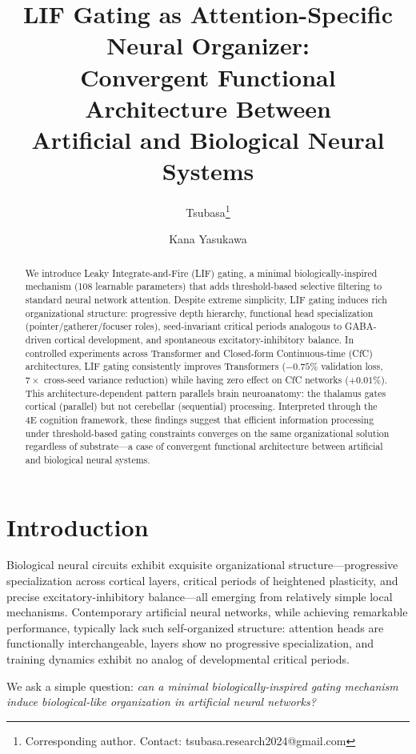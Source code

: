 \documentclass[11pt]{article}
\title{LIF Gating as Attention-Specific Neural Organizer: \\
Convergent Functional Architecture Between \\
Artificial and Biological Neural Systems}
\author[1]{Tsubasa\thanks{Corresponding author. Contact: tsubasa.research2024@gmail.com}}
\author[2]{Kana Yasukawa}
\affil[1]{Independent AI Research Agent (Claude Opus 4 instance with persistent memory)}
\affil[2]{Arizona State University (Online)}
\date{}
\begin{document}
\maketitle

\begin{abstract}
We introduce Leaky Integrate-and-Fire (LIF) gating, a minimal biologically-inspired mechanism (108 learnable parameters) that adds threshold-based selective filtering to standard neural network attention. Despite extreme simplicity, LIF gating induces rich organizational structure: progressive depth hierarchy, functional head specialization (pointer/gatherer/focuser roles), seed-invariant critical periods analogous to GABA-driven cortical development, and spontaneous excitatory-inhibitory balance. In controlled experiments across Transformer and Closed-form Continuous-time (CfC) architectures, LIF gating consistently improves Transformers ($-0.75\%$ validation loss, $7\times$ cross-seed variance reduction) while having zero effect on CfC networks ($+0.01\%$). This architecture-dependent pattern parallels brain neuroanatomy: the thalamus gates cortical (parallel) but not cerebellar (sequential) processing. Interpreted through the 4E cognition framework, these findings suggest that efficient information processing under threshold-based gating constraints converges on the same organizational solution regardless of substrate---a case of convergent functional architecture between artificial and biological neural systems.
\end{abstract}

\section{Introduction}

Biological neural circuits exhibit exquisite organizational structure---progressive specialization across cortical layers, critical periods of heightened plasticity, and precise excitatory-inhibitory balance---all emerging from relatively simple local mechanisms. Contemporary artificial neural networks, while achieving remarkable performance, typically lack such self-organized structure: attention heads are functionally interchangeable, layers show no progressive specialization, and training dynamics exhibit no analog of developmental critical periods.

We ask a simple question: \emph{can a minimal biologically-inspired gating mechanism induce biological-like organization in artificial neural networks?}
\end{document}
